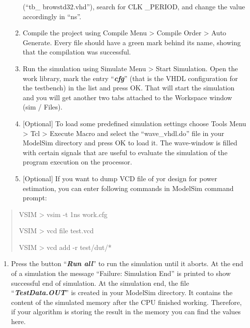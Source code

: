 \documentclass[
]{article}
\begin{document}
\begin{enumerate}
\begin{enumerate}
    (``tb\_ browstd32.vhd''), search for CLK \_PERIOD, and change the
    value accordingly in ``ns''.
  \item
    Compile the project using Compile Menu \textgreater{} Compile Order
    \textgreater{} Auto Generate. Every file should have a green mark
    behind its name, showing that the compilation was successful.
  \item
    Run the simulation using Simulate Menu \textgreater{} Start
    Simulation. Open the work library, mark the entry
    ``\emph{\textbf{cfg}}'' (that is the VHDL configuration for the
    testbench) in the list and press OK. That will start the simulation
    and you will get another two tabs attached to the Workspace window
    (sim / Files).
  \item
    {[}Optional{]} To load some predefined simulation settings choose
    Tools Menu \textgreater{} Tcl \textgreater{} Execute Macro and
    select the ``wave\_vhdl.do'' file in your ModelSim directory and
    press OK to load it. The wave-window is filled with certain signals
    that are useful to evaluate the simulation of the program execution
    on the processor.
  \item
    {[}Optional{]} If you want to dump VCD file of yor design for power
    estimation, you can enter following commands in ModelSim command
    prompt:
  \end{enumerate}
\end{enumerate}

\begin{quote}
VSIM \textgreater{} vsim -t 1ns work.cfg

VSIM \textgreater{} vcd file test.vcd

VSIM \textgreater{} vcd add -r test/dut/*
\end{quote}

\begin{enumerate}
\def\labelenumi{\arabic{enumi}.}
\setcounter{enumi}{14}
\item
  Press the button ``\emph{\textbf{Run all}}'' to run the simulation
  until it aborts. At the end of a simulation the message ``Failure:
  Simulation End'' is printed to show successful end of simulation. At
  the simulation end, the file ``\emph{\textbf{TestData.OUT}}'' is
  created in your ModelSim directory. It contains the content of the
  simulated memory after the CPU finished working. Therefore, if your
  algorithm is storing the result in the memory you can find the values
  here.
\end{enumerate}
\end{document}
